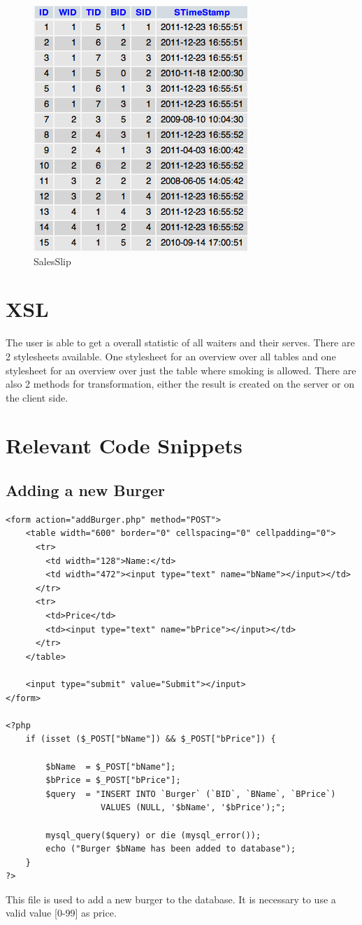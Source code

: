\documentclass[10pt, a4paper]{article}
\begin{document}
\begin{figure}[htb]
	\centering
	\includegraphics[scale=0.9]{fig/salesslip.png}
	\caption{SalesSlip}
\end{figure}

\section{XSL}
The user is able to get a overall statistic of all waiters and their serves. There are 2 stylesheets available. One stylesheet for an overview over all tables and one stylesheet for an overview over just the table where smoking is allowed. There are also 2 methods for transformation, either the result is created on the server or on the client side.

\pagebreak
\section{Relevant Code Snippets}
\subsection{Adding a new Burger}

\begin{lstlisting}[caption=addBurger.php]
<form action="addBurger.php" method="POST">
    <table width="600" border="0" cellspacing="0" cellpadding="0">
      <tr>
        <td width="128">Name:</td>
        <td width="472"><input type="text" name="bName"></input></td>
      </tr>
      <tr>
        <td>Price</td>
        <td><input type="text" name="bPrice"></input></td>
      </tr>
    </table>
    
    <input type="submit" value="Submit"></input>
</form>

<?php
    if (isset ($_POST["bName"]) && $_POST["bPrice"]) {
        
        $bName  = $_POST["bName"];
        $bPrice = $_POST["bPrice"];
        $query  = "INSERT INTO `Burger` (`BID`, `BName`, `BPrice`)
                   VALUES (NULL, '$bName', '$bPrice');";
        
        mysql_query($query) or die (mysql_error());
        echo ("Burger $bName has been added to database");
    }
?>
\end{lstlisting}
This file is used to add a new burger to the database. It is necessary to use a valid value [0-99] as price.
\end{document}
